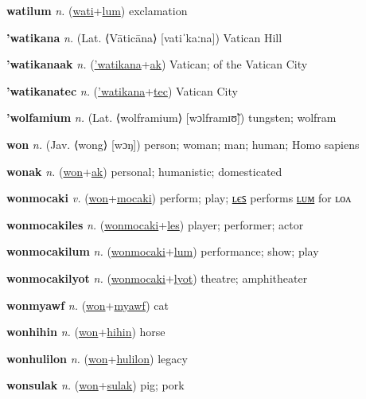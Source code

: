 \textbf{\hypertarget{watilum}{watilum}} \textit{n.} (\hyperlink{wati}{wati}+\allowbreak \hyperlink{lum}{lum})
exclamation

\textbf{\hypertarget{'watikana}{'watikana}} \textit{n.} (Lat. ⟨Vāticāna⟩ [vatiˈkaːna])
Vatican Hill

\textbf{\hypertarget{'watikanaak}{'watikanaak}} \textit{n.} (\hyperlink{'watikana}{'watikana}+\allowbreak \hyperlink{ak}{ak})
Vatican; of the Vatican City

\textbf{\hypertarget{'watikanatec}{'watikanatec}} \textit{n.} (\hyperlink{'watikana}{'watikana}+\allowbreak \hyperlink{tec}{tec})
Vatican City

\textbf{\hypertarget{'wolfamium}{'wolfamium}} \textit{n.} (Lat. ⟨wolframium⟩ [wɔlframɪʊ̃])
tungsten; wolfram

\textbf{\hypertarget{won}{won}} \textit{n.} (Jav. ⟨wong⟩ [wɔŋ])
person; woman; man; human; Homo sapiens

\textbf{\hypertarget{wonak}{wonak}} \textit{n.} (\hyperlink{won}{won}+\allowbreak \hyperlink{ak}{ak})
personal; humanistic; domesticated

\textbf{\hypertarget{wonmocaki}{wonmocaki}} \textit{v.} (\hyperlink{won}{won}+\allowbreak \hyperlink{mocaki}{mocaki})
perform; play; \hyperlink{wonmocakiles}{ʟєꜱ} performs \hyperlink{wonmocakilum}{ʟᴜᴍ} for ʟᴏᴧ

\textbf{\hypertarget{wonmocakiles}{wonmocakiles}} \textit{n.} (\hyperlink{wonmocaki}{wonmocaki}+\allowbreak \hyperlink{les}{les})
player; performer; actor

\textbf{\hypertarget{wonmocakilum}{wonmocakilum}} \textit{n.} (\hyperlink{wonmocaki}{wonmocaki}+\allowbreak \hyperlink{lum}{lum})
performance; show; play

\textbf{\hypertarget{wonmocakilyot}{wonmocakilyot}} \textit{n.} (\hyperlink{wonmocaki}{wonmocaki}+\allowbreak \hyperlink{lyot}{lyot})
theatre; amphitheater

\textbf{\hypertarget{wonmyawf}{wonmyawf}} \textit{n.} (\hyperlink{won}{won}+\allowbreak \hyperlink{myawf}{myawf})
cat

\textbf{\hypertarget{wonhihin}{wonhihin}} \textit{n.} (\hyperlink{won}{won}+\allowbreak \hyperlink{hihin}{hihin})
horse

\textbf{\hypertarget{wonhulilon}{wonhulilon}} \textit{n.} (\hyperlink{won}{won}+\allowbreak \hyperlink{hulilon}{hulilon})
legacy

\textbf{\hypertarget{wonsulak}{wonsulak}} \textit{n.} (\hyperlink{won}{won}+\allowbreak \hyperlink{sulak}{sulak})
pig; pork


